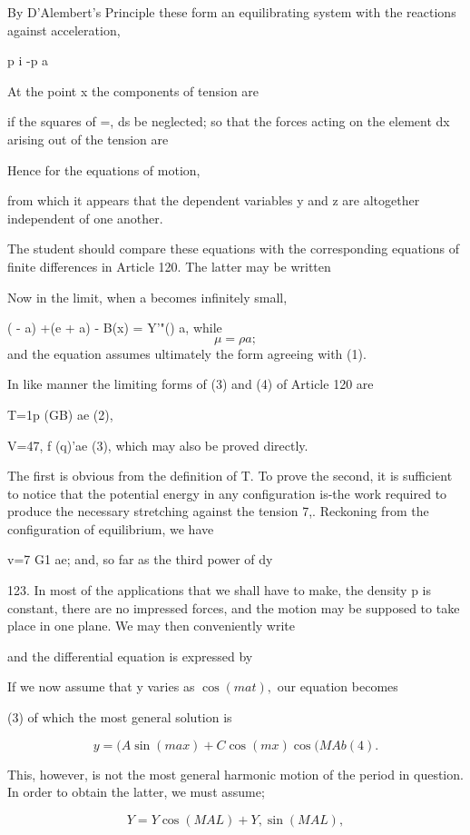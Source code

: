 By D'Alembert's Principle these form an equilibrating system with the reactions
against acceleration,

p i -p a

At the point x the components of tension are

if the squares of =, ds be neglected; so that the forces acting on the element
dx arising out of the tension are

Hence for the equations of motion,

from which it appears that the dependent variables y and z are altogether
independent of one another.

The student should compare these equations with the corresponding equations of
finite differences in Article 120. The latter may be written

Now in the limit, when a becomes infinitely small,

( - a) +(e + a) - B(x) = Y'"() a, while
\[\mu = \rho a;\]
and the equation
assumes ultimately the form agreeing with (1).

In like manner the limiting forms of (3) and (4) of Article 120 are

T=1p (GB) ae (2),

V=47, f (q)'ae (3), which may also be proved directly.

The first is obvious from the definition of T. To prove the second, it is
sufficient to notice that the potential energy in any configuration is-the work
required to produce the necessary stretching against the tension 7,. Reckoning
from the configuration of equilibrium, we have

v=7 G1 ae; and, so far as the third power of dy

123. In most of the applications that we shall have to make, the density p is
constant, there are no impressed forces, and the motion may be supposed to take
place in one plane. We may then conveniently write

and the differential equation is expressed by

If we now assume that y varies as \(\cos(mat),\) our equation becomes

(3) of which the most general solution is

\[y = (A \sin(max) + C \cos(mx) \cos(MAb (4).\]

This, however, is not the most general harmonic motion of the period in
question. In order to obtain the latter, we must assume;

\[Y = Y \cos(MAL) + Y, \sin(MAL),\]


